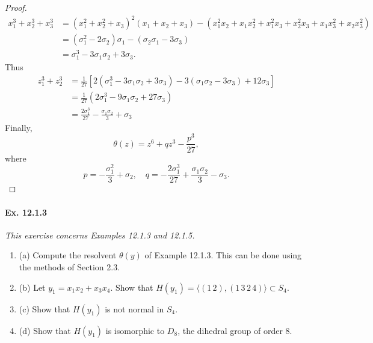 \documentclass[11pt,a4paper]{article}
\newcommand{\be} {\begin{enumerate}}
\newcommand{\ee} {\end{enumerate}}
\begin{document}
\begin{proof}
\begin{align*}
x_1^3+x_2^3+x_3^3 &= (x_1^2+x_2^2+x_3)^2(x_1+x_2+x_3) - (x_{1}^{2} x_{2} + x_{1} x_{2}^{2} +x_{1}^{2} x_{3} + x_{2}^{2} x_{3} + x_{1}x_{3}^{2} +x_{2} x_{3}^{2})\\
&=(\sigma_1^2-2\sigma_2)\sigma_1 - (\sigma_2 \sigma_1 - 3 \sigma_3)\\
&=\sigma_1^3 -3\sigma_1\sigma_2+3\sigma_3.
\end{align*}
Thus
\begin{align*}
z_1^3 + z_2^3 &= \frac{1}{27}\left[2(\sigma_1^3 -3\sigma_1\sigma_2+3\sigma_3) -3(\sigma_1 \sigma_2 - 3 \sigma_3) + 12 \sigma_3\right]\\
&= \frac{1}{27} (2 \sigma_1^3-9\sigma_1 \sigma_2 + 27 \sigma_3)\\
&=  \frac{2\sigma_1^3}{27} - \frac{\sigma_1\sigma_2}{3} + \sigma_3
\end{align*}
Finally,
$$\theta(z) = z^6 +q z^3 -\frac{p^3}{27},$$
where
$$p = -\frac{\sigma_1^2}{3} + \sigma_2,\quad q = -\frac{2\sigma_1^3}{27} + \frac{\sigma_1\sigma_2}{3}- \sigma_3.$$
\end{proof}

\paragraph{Ex. 12.1.3}

{\it This exercise concerns Examples 12.1.3 and 12.1.5.
\be
\item[(a)] Compute the resolvent $\theta(y)$ of Example 12.1.3. This can be done using the methods of Section 2.3.
\item[(b)] Let $y_1 = x_1x_2+x_3x_4$. Show that $H(y_1) = \langle (1\, 2),(1 \, 3\, 2\,4) \rangle \subset S_4$.
\item[(c)] Show that $H(y_1)$ is not normal in $S_4$.
\item[(d)] Show that $H(y_1)$ is isomorphic to $D_8$, the dihedral group of order 8.

\ee
}
\end{document}
